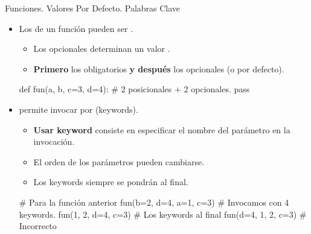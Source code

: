 \documentclass[10pt,envcountsect,spanish]{beamer}
\begin{document}
\begin{frame}[fragile]{Funciones. Valores Por Defecto. Palabras Clave }
\begin{itemize}%

\item Los  de un función pueden ser .
	\begin{itemize} \small 
	\item Los opcionales determinan un valor   . 
	\item \textbf{Primero} los obligatorios \textbf{y después} los opcionales (o por defecto).
	\end{itemize}

\begin{pyverbatim}[][frame=single]
def fun(a, b, c=3, d=4): #  2 posicionales + 2 opcionales.
    pass
\end{pyverbatim}


\item {} permite invocar por  (keywords).
	\begin{itemize} \small 
	\item \textbf{Usar keyword} consiste en especificar el nombre del parámetro en la invocación.
	\item El orden de los parámetros pueden cambiarse.
	\item Los keywords siempre se pondrán al final.
	\end{itemize}

\begin{pyverbatim}[][frame=single]
# Para la función anterior
fun(b=2, d=4, a=1, c=3) # Invocamos con 4 keywords.
fun(1, 2, d=4, c=3) # Los keywords al final
fun(d=4, 1, 2, c=3) # Incorrecto
\end{pyverbatim}

\end{itemize}
\end{frame}
\end{document}
